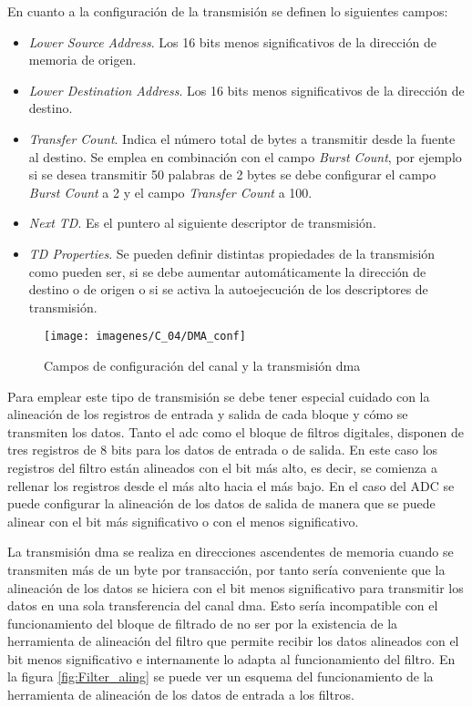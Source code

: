 En cuanto a la configuración de la transmisión se definen lo siguientes campos:

\begin{itemize}

\item \textit{Lower Source Address}. Los 16 bits menos significativos de la dirección de memoria de origen.

\item \textit{Lower Destination Address}. Los 16 bits menos significativos de la dirección de destino.

\item \textit{Transfer Count}. Indica el número total de bytes a transmitir desde la fuente al destino. Se emplea en combinación con el campo \textit{Burst Count}, por ejemplo si se desea transmitir 50 palabras de 2 bytes se debe configurar el campo \textit{Burst Count} a 2 y el campo \textit{Transfer Count} a 100.

\item \textit{Next TD}. Es el puntero al siguiente descriptor de transmisión. 

\item \textit{TD Properties}. Se pueden definir distintas propiedades de la transmisión como pueden ser, si se debe aumentar automáticamente la dirección de destino o de origen o si se activa la autoejecución de los descriptores de transmisión.

\end{itemize}

\begin{figure}[!ht]
	\center
	\texttt{[image: imagenes/C\_04/DMA\_conf]}
	\caption{Campos de configuración del canal y la transmisión \acrshort{dma} }
	\label{fig:DMA_conf}
\end{figure}


Para emplear este tipo de transmisión se debe tener especial cuidado con la alineación de los registros de entrada y salida de cada bloque y cómo se transmiten los datos. Tanto el \acrshort{adc} como el bloque de filtros digitales, disponen de tres registros de 8 bits para los datos de entrada o de salida. En este caso los registros del filtro están alineados con el bit más alto, es decir, se comienza a rellenar los registros desde el más alto hacia el más bajo. En el caso del ADC se  puede configurar la alineación de los datos de salida de manera que se puede alinear con el bit más significativo o con el menos significativo. 

La transmisión \acrshort{dma} se realiza en direcciones ascendentes de memoria cuando se transmiten más de un byte por transacción, por tanto sería conveniente que la alineación de los datos se hiciera con el bit menos significativo para transmitir los datos en una sola transferencia del canal \acrshort{dma}. Esto sería incompatible con el funcionamiento del bloque de filtrado de no ser por la existencia de la herramienta de alineación del filtro que permite recibir los datos alineados con el bit menos significativo e internamente lo adapta al funcionamiento del filtro. En la figura \ref{fig:Filter_aling} se puede ver un esquema del funcionamiento de la herramienta de alineación de los datos de entrada a los filtros.

